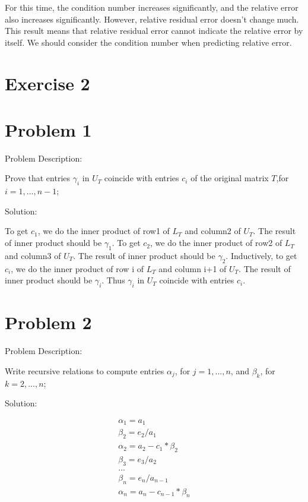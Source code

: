 \documentclass[12pt,letter,english]{article}
\begin{document}
For this time, the condition number increases significantly, and the relative error also increases significantly. However, relative residual error doesn't change much. This result means that relative residual error cannot indicate the relative error by itself. We should consider the condition number when predicting relative error.


\section*{Exercise 2}
\section*{Problem 1}

Problem Description:

Prove that entries $\gamma_i$ in $U_T$ coincide with entries $c_i$ of the original matrix $T$,for $i= 1,...,n-1$;

Solution:

To get $c_1$, we do the inner product of row1 of $L_T$ and column2 of $U_ T$. The result of inner product should be $\gamma_1$. To get $c_2$, we do the inner product of row2 of $L_T$ and column3 of $U_ T$. The result of inner product should be $\gamma_2$. Inductively, to get $c_i$, we do the inner product of row i of $L_T$ and column i+1 of $U_ T$. The result of inner product should be $\gamma_i$. Thus $\gamma_i$ in $U_T$ coincide with entries $c_i$.

\section*{Problem 2}

Problem Description:

Write recursive relations to compute entries $\alpha_j$, for $j = 1,...,n$, and $\beta_k$, for $k = 2,...,n$;

Solution:
\begin{ceqn}
\begin{align*}
  \alpha_1 = a_1 \\
  \beta_2 = e_2/a_1 \\
  \alpha_2 = a_2 - c_1 * \beta_2 \\
  \beta_3 = e_3/a_2 \\
  ... \\
  \beta_n = e_n/a_{n-1} \\
  \alpha_n = a_n - c_{n-1} * \beta_{n} \\
\end{align*}
\end{ceqn}
\end{document}
